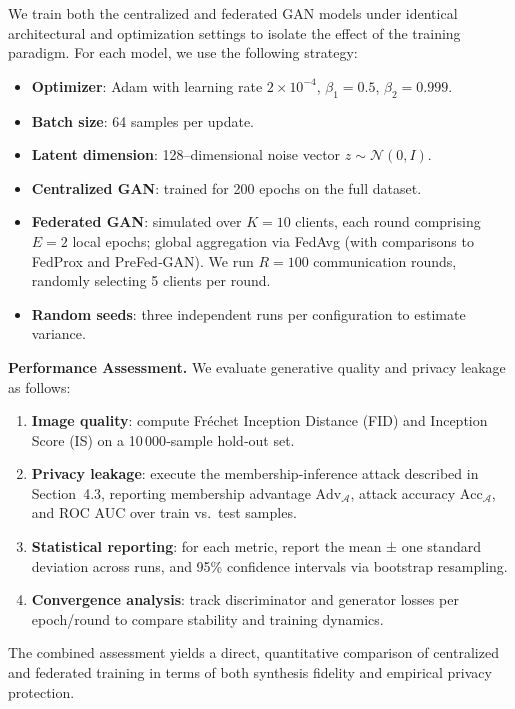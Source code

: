 \documentclass{article}
\begin{document}
We train both the centralized and federated GAN models under identical architectural and optimization settings to isolate the effect of the training paradigm. For each model, we use the following strategy:
\begin{itemize}[itemsep=0.5ex, topsep=0.5ex]
  \item \textbf{Optimizer}: Adam with learning rate $2\times10^{-4}$, $\beta_{1}=0.5$, $\beta_{2}=0.999$.
  \item \textbf{Batch size}: 64 samples per update.
  \item \textbf{Latent dimension}: 128–dimensional noise vector $z\!\sim\!\mathcal{N}(0,I)$.
  \item \textbf{Centralized GAN}: trained for 200 epochs on the full dataset.
  \item \textbf{Federated GAN}: simulated over $K=10$ clients, each round comprising $E=2$ local epochs; global aggregation via FedAvg (with comparisons to FedProx and PreFed‑GAN). We run $R=100$ communication rounds, randomly selecting 5 clients per round.
  \item \textbf{Random seeds}: three independent runs per configuration to estimate variance.
\end{itemize}

\medskip

\noindent\textbf{Performance Assessment.} We evaluate generative quality and privacy leakage as follows:
\begin{enumerate}[itemsep=0.5ex, topsep=0.5ex]
  \item \textbf{Image quality}: compute Fréchet Inception Distance (FID) and Inception Score (IS) on a 10\,000‑sample hold‑out set.
  \item \textbf{Privacy leakage}: execute the membership‑inference attack described in Section 4.3, reporting membership advantage $\mathrm{Adv}_{\mathcal{A}}$, attack accuracy $\mathrm{Acc}_{\mathcal{A}}$, and ROC AUC over train vs.\ test samples.
  \item \textbf{Statistical reporting}: for each metric, report the mean ± one standard deviation across runs, and 95\% confidence intervals via bootstrap resampling.
  \item \textbf{Convergence analysis}: track discriminator and generator losses per epoch/round to compare stability and training dynamics.
\end{enumerate}
\noindent The combined assessment yields a direct, quantitative comparison of centralized and federated training in terms of both synthesis fidelity and empirical privacy protection.
\end{document}
